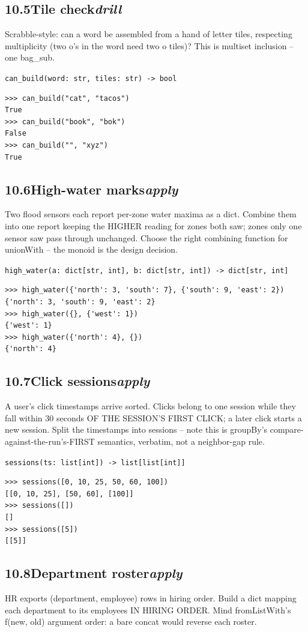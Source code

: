 \documentclass[10pt,letterpaper]{book}
\begin{document}
\subsection*{10.5\quad Tile check\hfill\textnormal{\textit{drill}}}
Scrabble-style: can a word be assembled from a hand of letter tiles, respecting multiplicity (two o's in the word need two o tiles)? This is multiset inclusion -- one bag\_sub.

\noindent\texttt{can\_build(word: str, tiles: str) -> bool}
\begin{lstlisting}[style=ex]
>>> can_build("cat", "tacos")
True
>>> can_build("book", "bok")
False
>>> can_build("", "xyz")
True
\end{lstlisting}
\subsection*{10.6\quad High-water marks\hfill\textnormal{\textit{apply}}}
Two flood sensors each report per-zone water maxima as a dict. Combine them into one report keeping the HIGHER reading for zones both saw; zones only one sensor saw pass through unchanged. Choose the right combining function for unionWith -- the monoid is the design decision.

\noindent\texttt{high\_water(a: dict[str, int], b: dict[str, int]) -> dict[str, int]}
\begin{lstlisting}[style=ex]
>>> high_water({'north': 3, 'south': 7}, {'south': 9, 'east': 2})
{'north': 3, 'south': 9, 'east': 2}
>>> high_water({}, {'west': 1})
{'west': 1}
>>> high_water({'north': 4}, {})
{'north': 4}
\end{lstlisting}
\subsection*{10.7\quad Click sessions\hfill\textnormal{\textit{apply}}}
A user's click timestamps arrive sorted. Clicks belong to one session while they fall within 30 seconds OF THE SESSION'S FIRST CLICK; a later click starts a new session. Split the timestamps into sessions -- note this is groupBy's compare-against-the-run's-FIRST semantics, verbatim, not a neighbor-gap rule.

\noindent\texttt{sessions(ts: list[int]) -> list[list[int]]}
\begin{lstlisting}[style=ex]
>>> sessions([0, 10, 25, 50, 60, 100])
[[0, 10, 25], [50, 60], [100]]
>>> sessions([])
[]
>>> sessions([5])
[[5]]
\end{lstlisting}
\subsection*{10.8\quad Department roster\hfill\textnormal{\textit{apply}}}
HR exports (department, employee) rows in hiring order. Build a dict mapping each department to its employees IN HIRING ORDER. Mind fromListWith's f(new, old) argument order: a bare concat would reverse each roster.
\end{document}
